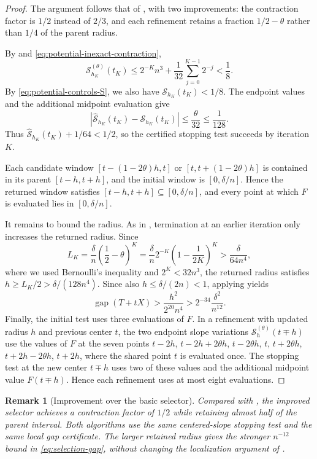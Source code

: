 \documentclass[10pt,a4paper]{article}
\newtheorem{remark}{Remark}[section]
\DeclareMathOperator{\gap}{gap}
\begin{document}
\begin{proof}
The argument follows that of , with
two improvements: the contraction factor is $1/2$ instead of
$2/3$, and each refinement retains a fraction $1/2-\theta$
rather than $1/4$ of the parent radius.

By  and
\eqref{eq:potential-inexact-contraction},
\[
\mathcal S_{h_K}^{(\theta)}(t_K)
\leq 2^{-K}n^3+\frac1{32}\sum_{j=0}^{K-1}2^{-j}
<\frac18.
\]
By \eqref{eq:potential-controls-S}, we also have
$\mathcal S_{h_K}(t_K)<1/8$. The endpoint values and
the additional midpoint evaluation give
\[
\left|\widehat{\mathcal S}_{h_K}(t_K)
-\mathcal S_{h_K}(t_K)\right|
\leq\frac{\theta}{32}\leq\frac1{128}.
\]
Thus $\widehat{\mathcal S}_{h_K}(t_K)+1/64<1/2$,
so the certified stopping test succeeds by iteration $K$.

Each candidate window $[t-(1-2\theta)h,t]$ or
$[t,t+(1-2\theta)h]$ is contained in its parent
$[t-h,t+h]$, and the initial window is $[0,\delta/n]$.
Hence the returned window satisfies
$[t-h,t+h]\subseteq[0,\delta/n]$, and every point at
which $F$ is evaluated lies in $[0,\delta/n]$.

It remains to bound the radius. As in
, termination at an earlier
iteration only increases the returned radius. Since
\[
L_K=\frac{\delta}{n}
\left(\frac12-\theta\right)^K
=\frac{\delta}{n}2^{-K}
\left(1-\frac1{2K}\right)^K
>\frac{\delta}{64n^4},
\]
where we used Bernoulli's inequality and $2^K<32n^3$,
the returned radius satisfies
$h\geq L_K/2>\delta/(128n^4)$.
Since also $h\leq\delta/(2n)<1$, applying  yields
\[
\gap(T+tX)>
\frac{h^2}{2^{20}n^4}
>2^{-34}\frac{\delta^2}{n^{12}}.
\]
Finally, the initial test uses three evaluations of $F$.
In a refinement with updated radius $h$ and previous
center $t$, the two endpoint slope variations
$\mathcal S_h^{(\theta)}(t\mp h)$ use the values of $F$
at the seven points $t-2h$, $t-2h+2\theta h$, $t-2\theta h$,
$t$, $t+2\theta h$, $t+2h-2\theta h$, $t+2h$, where the
shared point $t$ is evaluated once. The stopping test at
the new center $t\mp h$ uses two of these values and the
additional midpoint value $F(t\mp h)$. Hence each refinement
uses at most eight evaluations.
\end{proof}

\begin{remark}[Improvement over the basic selector]
\label{rem:selection-scale}
Compared with , the improved selector
achieves a contraction factor of $1/2$ while retaining almost
half of the parent interval. Both algorithms use the same
centered-slope stopping test and the same local gap certificate.
The larger retained radius gives the stronger $n^{-12}$ bound
in \eqref{eq:selection-gap}, without changing the localization
argument of .
\end{remark}
\end{document}
